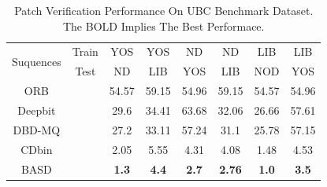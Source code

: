 \documentclass[conference]{IEEEtran}
\begin{document}
\begin{table}[h]
\centering
\scriptsize
\caption{Patch Verification Performance On UBC Benchmark Dataset. The BOLD Implies The Best Performace.}
\label{table_example}
\begin{center}
\begin{tabular}{cccccccc}
\toprule
\midrule
\multirow{2}{*}{Suquences} & \multicolumn{1}{c}{Train} & \multicolumn{1}{c}{YOS} & \multicolumn{1}{c}{YOS}  & \multicolumn{1}{c}{ND}  & \multicolumn{1}{c}{ND}  & \multicolumn{1}{c}{LIB}   & \multicolumn{1}{c}{LIB}  \\
  \cline{3-8}
                           & \multicolumn{1}{c}{Test} & \multicolumn{1}{c}{ND} & \multicolumn{1}{c}{LIB}  & \multicolumn{1}{c}{YOS}  & \multicolumn{1}{c}{LIB}  & \multicolumn{1}{c}{NOD}   & \multicolumn{1}{c}{YOS}  \\
  \cline{3-8}


\multirow{1}{*}{ORB}   & \multicolumn{1}{c}{} & \multicolumn{1}{c}{54.57} & \multicolumn{1}{c}{59.15} & \multicolumn{1}{c}{54.96}  & \multicolumn{1}{c}{59.15}  & \multicolumn{1}{c}{54.57}  & \multicolumn{1}{c}{54.96}  \\
  \cline{3-8}
\multirow{1}{*}{Deepbit} & \multicolumn{1}{c}{}  & \multicolumn{1}{c}{29.6} & \multicolumn{1}{c}{34.41} & \multicolumn{1}{c}{63.68}  & \multicolumn{1}{c}{32.06}  & \multicolumn{1}{c}{26.66}  & \multicolumn{1}{c}{57.61}  \\
  \cline{3-8}
\multirow{1}{*}{DBD-MQ}   & \multicolumn{1}{c}{}  & \multicolumn{1}{c}{27.2} & \multicolumn{1}{c}{33.11} & \multicolumn{1}{c}{57.24}  & \multicolumn{1}{c}{31.1}  & \multicolumn{1}{c}{25.78}  & \multicolumn{1}{c}{57.15}  \\
  \cline{3-8}
\multirow{1}{*}{CDbin}   & \multicolumn{1}{c}{}  & \multicolumn{1}{c}{2.05} & \multicolumn{1}{c}{5.55} & \multicolumn{1}{c}{4.31}  & \multicolumn{1}{c}{4.08}  & \multicolumn{1}{c}{1.48}  & \multicolumn{1}{c}{4.53}  \\
  \cline{3-8}
\multirow{1}{*}{BASD}  & \multicolumn{1}{c}{}  & \multicolumn{1}{c}{\textbf{1.3}} & \multicolumn{1}{c}{\textbf{4.4}} & \multicolumn{1}{c}{\textbf{2.7}}  & \multicolumn{1}{c}{\textbf{2.76}}  & \multicolumn{1}{c}{\textbf{1.0}}  & \multicolumn{1}{c}{\textbf{3.5}}  \\
\midrule
\toprule
\end{tabular} 
\end{center}
\end{table}
\vspace{-0.47cm}
\end{document}
